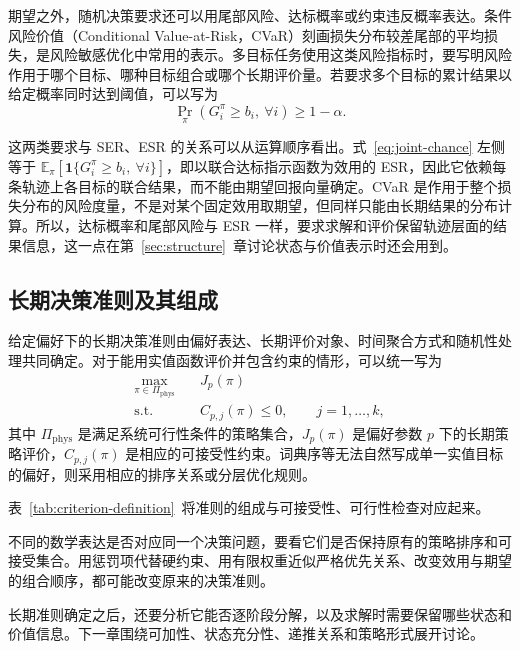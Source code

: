 期望之外，随机决策要求还可以用尾部风险、达标概率或约束违反概率表达。条件风险价值（Conditional Value-at-Risk，CVaR）刻画损失分布较差尾部的平均损失，是风险敏感优化中常用的表示\cite{rockafellar2000}。多目标任务使用这类风险指标时，要写明风险作用于哪个目标、哪种目标组合或哪个长期评价量。若要求多个目标的累计结果以给定概率同时达到阈值，可以写为
\begin{equation}\label{eq:joint-chance}
\Pr_{\pi}\!\left(
G_i^{\pi}\geq b_i,\ \forall i
\right)
\geq 1-\alpha.
\end{equation}

这两类要求与 SER、ESR 的关系可以从运算顺序看出。式~\eqref{eq:joint-chance} 左侧等于 $\mathbb E_\pi[\mathbf 1\{G_i^\pi\geq b_i,\ \forall i\}]$，即以联合达标指示函数为效用的 ESR，因此它依赖每条轨迹上各目标的联合结果，而不能由期望回报向量确定。CVaR 是作用于整个损失分布的风险度量，不是对某个固定效用取期望，但同样只能由长期结果的分布计算。所以，达标概率和尾部风险与 ESR 一样，要求求解和评价保留轨迹层面的结果信息，这一点在第~\ref{sec:structure}~章讨论状态与价值表示时还会用到。

\subsection{长期决策准则及其组成}\label{sec:criteria-summary}

给定偏好下的长期决策准则由偏好表达、长期评价对象、时间聚合方式和随机性处理共同确定。对于能用实值函数评价并包含约束的情形，可以统一写为
\begin{equation}
\begin{aligned}
\max_{\pi\in\Pi_{\mathrm{phys}}}\quad
& J_p(\pi) \\
\mathrm{s.t.}\quad
& C_{p,j}(\pi)\leq 0,
\qquad j=1,\ldots,k ,
\end{aligned}
\end{equation}
其中 $\Pi_{\mathrm{phys}}$ 是满足系统可行性条件的策略集合，$J_p(\pi)$ 是偏好参数 $p$ 下的长期策略评价，$C_{p,j}(\pi)$ 是相应的可接受性约束。词典序等无法自然写成单一实值目标的偏好，则采用相应的排序关系或分层优化规则。

表~\ref{tab:criterion-definition}~将准则的组成与可接受性、可行性检查对应起来。


不同的数学表达是否对应同一个决策问题，要看它们是否保持原有的策略排序和可接受集合。用惩罚项代替硬约束、用有限权重近似严格优先关系、改变效用与期望的组合顺序，都可能改变原来的决策准则。

长期准则确定之后，还要分析它能否逐阶段分解，以及求解时需要保留哪些状态和价值信息。下一章围绕可加性、状态充分性、递推关系和策略形式展开讨论。
